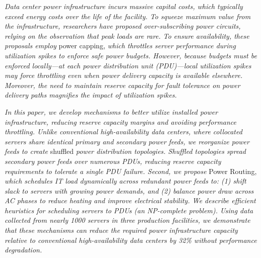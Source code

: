 
\emph{Data center power infrastructure incurs massive capital costs, which typically exceed energy costs over the life of the facility. To squeeze maximum value from the infrastructure, researchers have proposed over-subscribing power circuits, relying on the observation that peak loads are rare.  To ensure availability, these proposals employ} power capping, \emph{which throttles server performance during utilization spikes to enforce safe power budgets.  However, because budgets must be enforced locally---at each power distribution unit (PDU)---local utilization spikes may force throttling even when power delivery capacity is available elsewhere.  Moreover, the need to maintain reserve capacity for fault tolerance on power delivery paths magnifies the impact of utilization spikes.}

\emph{In this paper, we develop mechanisms to better utilize installed power infrastructure, reducing reserve capacity margins and avoiding performance throttling. Unlike conventional high-availability data centers, where collocated servers share identical primary and secondary power feeds, we reorganize power feeds to create} shuffled \emph{power distribution topologies. Shuffled topologies spread secondary power feeds over numerous PDUs, reducing reserve capacity requirements to tolerate a single PDU failure.  Second, we propose} Power Routing, \emph{which schedules IT load dynamically across redundant power feeds to: (1) shift slack to servers with growing power demands, and (2) balance power draw across AC phases to reduce heating and improve electrical stability.  We describe efficient heuristics for scheduling servers to PDUs (an NP-complete problem). Using data collected from nearly 1000 servers in three production facilities, we demonstrate that these mechanisms can reduce the required power infrastructure capacity relative to conventional high-availability data centers by 32\% without performance degradation.}


